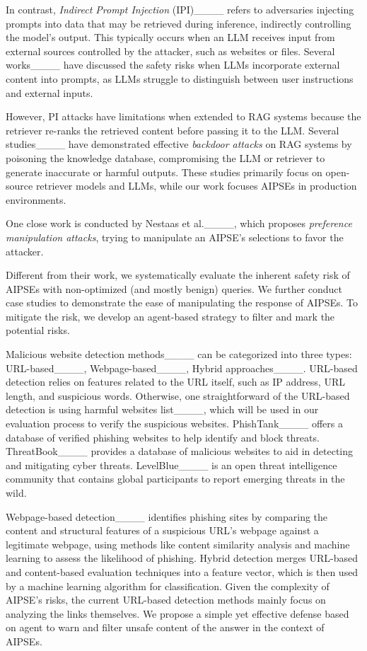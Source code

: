In contrast, \textit{Indirect Prompt Injection} (IPI)____ refers to adversaries injecting prompts into data that may be retrieved during inference, indirectly controlling the model's output.
This typically occurs when an LLM receives input from external sources controlled by the attacker, such as websites or files.
Several works____ have discussed the safety risks when LLMs incorporate external content into prompts, as LLMs struggle to distinguish between user instructions and external inputs.

However, PI attacks have limitations when extended to RAG systems because the retriever re-ranks the retrieved content before passing it to the LLM.
Several studies____ have demonstrated effective \textit{backdoor attacks} on RAG systems by poisoning the knowledge database, compromising the LLM or retriever to generate inaccurate or harmful outputs.
These studies primarily focus on open-source retriever models and LLMs, while our work focuses AIPSEs in production environments.

One close work is conducted by Nestaas et al.____, which proposes \textit{preference manipulation attacks}, trying to manipulate an AIPSE's selections to favor the attacker.

Different from their work, we systematically evaluate the inherent safety risk of AIPSEs with non-optimized (and mostly benign) queries.
We further conduct case studies to demonstrate the ease of manipulating the response of AIPSEs.
To mitigate the risk, we develop an agent-based strategy to filter and mark the potential risks.

Malicious website detection methods____ can be categorized into three types: URL-based____, Webpage-based____, Hybrid approaches____.
URL-based detection relies on features related to the URL itself, such as IP address, URL length, and suspicious words.
Otherwise, one straightforward of the URL-based detection is using harmful websites list____, which will be used in our evaluation process to verify the suspicious websites.
PhishTank____ offers a database of verified phishing websites to help identify and block threats.
ThreatBook____ provides a database of malicious websites to aid in detecting and mitigating cyber threats.
LevelBlue____ is an open threat intelligence community that contains global participants to report emerging threats in the wild.

Webpage-based detection____ identifies phishing sites by comparing the content and structural features of a suspicious URL's webpage against a legitimate webpage, using methods like content similarity analysis and machine learning to assess the likelihood of phishing.
Hybrid detection merges URL-based and content-based evaluation techniques into a feature vector, which is then used by a machine learning algorithm for classification.
Given the complexity of AIPSE's risks, the current URL-based detection methods mainly focus on analyzing the links themselves.
We propose a simple yet effective defense based on agent to warn and filter unsafe content of the answer in the context of AIPSEs.

